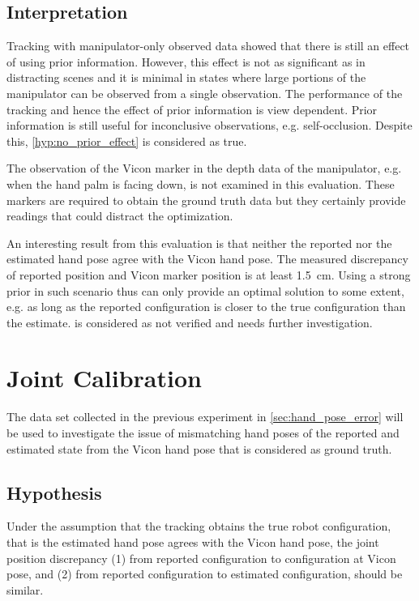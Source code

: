 \subsection{Interpretation}

Tracking with manipulator-only observed data showed that there is still an effect of using prior information. However, this effect is not as significant as in distracting scenes and it is minimal in states where large portions of the manipulator can be observed from a single observation. The performance of the tracking and hence the effect of prior information is view dependent. Prior information is still useful for inconclusive observations, e.g. self-occlusion. Despite this, \cref{hyp:no_prior_effect} is considered as true.

The observation of the Vicon marker in the depth data of the manipulator, e.g. when the hand palm is facing down, is not examined in this evaluation. These markers are required to obtain the ground truth data but they certainly provide  readings that could distract the optimization.

An interesting result from this evaluation is that neither the reported nor the estimated hand pose agree with the Vicon hand pose. The measured discrepancy of reported position and Vicon marker position is at least \SI{1.5}{\cm}. Using a strong prior in such scenario thus can only provide an optimal solution to some extent, e.g. as long as the reported configuration is closer to the true configuration than the estimate.  is considered as not verified and needs further investigation.


\section{Joint Calibration}

The data set collected in the previous experiment in \cref{sec:hand_pose_error} will be used to investigate the issue of mismatching hand poses of the reported and estimated state from the Vicon hand pose that is considered as ground truth.

\subsection{Hypothesis}

Under the assumption that the tracking obtains the true robot configuration, that is the estimated hand pose agrees with the Vicon hand pose, the joint position discrepancy (1) from reported configuration to configuration at Vicon pose, and (2) from reported configuration to estimated configuration, should be similar.

